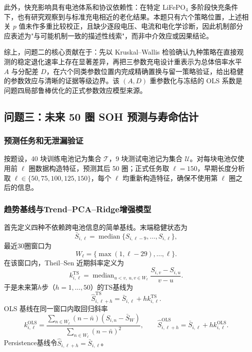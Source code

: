 \documentclass[withoutpreface]{cumcmthesis}
\newcommand{\TS}{\mathrm{TS}}
\begin{document}
此外，快充影响具有电池体系和协议依赖性：在特定 LiFePO$_4$ 多阶段快充条件下，也有研究观察到与标准充电相近的老化结果\cite{ansean2016}。本题只有六个策略位置，上述相关 $p$ 值未作多重比较校正，且缺少逐段电压、电流和电化学诊断，因此机制部分应表述为"与可能机制一致的描述性线索"，而非中介效应或因果结论。

综上，问题二的核心贡献在于：先以 Kruskal--Wallis 检验确认九种策略在直接观测的稳定退化速率上存在显著差异，再把三参数充电设计重表示为总体倍率水平 $A$ 与分配差 $D$，在六个同类参数位置内完成精确置换与留一策略验证，给出稳健的参数效应与清晰的证据等级边界。该 $(A,D)$ 重参数化与冻结的 OLS 系数是问题四局部鲁棒优化的正式参数效应模型来源。



\subsection{问题三：未来 50 圈 SOH 预测与寿命估计}

\subsubsection{预测任务和无泄漏验证}

按题设，40 块训练电池记为集合 $\mathcal T$，9 块测试电池记为集合 $\mathcal U$。对每块电池仅使用前 $\ell$ 圈数据构造特征，预测其后 50 圈；正式任务取 $\ell=150$，早期长度分析取 $\ell\in\{50,75,100,125,150\}$，每个 $\ell$ 均重新构造特征，确保不使用第 $\ell$ 圈之后的信息。

\subsubsection{趋势基线与Trend--PCA--Ridge增强模型}

首先定义四种不依赖跨电池信息的简单基线。末端稳健状态为
\begin{equation}
\bar S_{i,\ell}=\operatorname{median}
\{S_{i,\ell-9},\ldots,S_{i,\ell}\},
\end{equation}
最近30圈窗口为
\begin{equation}
W_{\ell}=\{\max(1,\ell-29),\ldots,\ell\}.
\end{equation}
在该窗口内，Theil--Sen 近期斜率定义为
\begin{equation}
k_{i,\ell}^{\TS}
=\operatorname{median}_{u<v,\ u,v\in W_{\ell}}
\frac{S_{i,v}-S_{i,u}}{v-u}.
\end{equation}
于是未来第$h$步（$h=1,\ldots,50$）的TS基线为
\begin{equation}
\widehat S_{i,\ell+h}^{\TS}
=\bar S_{i,\ell}+h k_{i,\ell}^{\TS}.
\label{eq:tsbaseline}
\end{equation}
OLS 基线在同一窗口内取回归斜率
\begin{equation}
k_{i,\ell}^{\mathrm{OLS}}
=\frac{\sum_{n\in W_{\ell}}(n-\bar n)(S_{i,n}-\bar S_W)}
{\sum_{n\in W_{\ell}}(n-\bar n)^2},
\qquad
\widehat S_{i,\ell+h}^{\mathrm{OLS}}
=\bar S_{i,\ell}+h k_{i,\ell}^{\mathrm{OLS}}.
\end{equation}
Persistence基线令$\widehat S_{i,\ell+h}=\bar S_{i,\ell}$。
\end{document}
